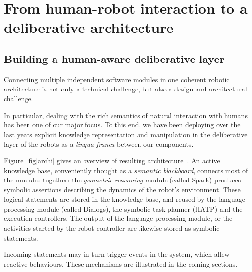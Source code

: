 \documentclass[preprint,3p,times]{elsarticle}
\begin{document}
\section{From human-robot interaction to a deliberative architecture}

\subsection{Building a human-aware deliberative layer}

Connecting multiple independent software modules in one coherent robotic
architecture is not only a technical challenge, but also a design and
architectural challenge.

In particular, dealing with the rich semantics of natural interaction with
humans has been one of our major focus. To this end, we have been deploying
over the last years explicit knowledge representation and manipulation in the
deliberative layer of the robots as a {\it lingua franca} between our
components.

Figure~\ref{fig|archi} gives an overview of resulting
architecture~\cite{Alami2011}. An active knowledge base, conveniently thought
as a \emph{semantic blackboard}, connects most of the modules together: the
\emph{geometric reasoning} module (called {\sc Spark}) produces symbolic
assertions describing the dynamics of the robot's environment. These logical
statements are stored in the knowledge base, and reused by the language
processing module (called {\sc Dialogs}), the symbolic task planner (HATP) and
the execution controllers. The output of the language processing module, or the
activities started by the robot controller are likewise stored as symbolic
statements.

Incoming statements may in turn trigger events in the system, which
allow reactive behaviours. These mechanisms are illustrated in the coming
sections.
\end{document}
